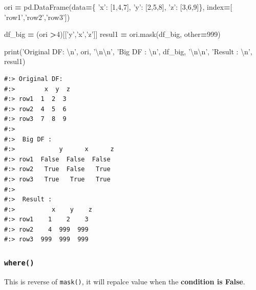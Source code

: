 \documentclass[
]{book}
\newenvironment{Shaded}{\begin{snugshade}}{\end{snugshade}}
\newcommand{\BuiltInTok}[1]{#1}
\newcommand{\CharTok}[1]{\textcolor[rgb]{0.5,0.5,0.5}{#1}}
\newcommand{\DecValTok}[1]{\textcolor[rgb]{0.06,0.06,0.06}{#1}}
\newcommand{\NormalTok}[1]{#1}
\newcommand{\OperatorTok}[1]{\textcolor[rgb]{0.43,0.43,0.43}{\textbf{#1}}}
\newcommand{\StringTok}[1]{\textcolor[rgb]{0.5,0.5,0.5}{#1}}
\begin{document}
\begin{Shaded}
\begin{Highlighting}[]
\NormalTok{ori }\OperatorTok{=}\NormalTok{ pd.DataFrame(data}\OperatorTok{=}\NormalTok{\{}
     \StringTok{'x'}\NormalTok{: [}\DecValTok{1}\NormalTok{,}\DecValTok{4}\NormalTok{,}\DecValTok{7}\NormalTok{],}
     \StringTok{'y'}\NormalTok{: [}\DecValTok{2}\NormalTok{,}\DecValTok{5}\NormalTok{,}\DecValTok{8}\NormalTok{],}
     \StringTok{'z'}\NormalTok{: [}\DecValTok{3}\NormalTok{,}\DecValTok{6}\NormalTok{,}\DecValTok{9}\NormalTok{]\}, index}\OperatorTok{=}\NormalTok{[}
     \StringTok{'row1'}\NormalTok{,}\StringTok{'row2'}\NormalTok{,}\StringTok{'row3'}\NormalTok{])}

\NormalTok{df_big }\OperatorTok{=}\NormalTok{ (ori }\OperatorTok{>}\DecValTok{4}\NormalTok{)[[}\StringTok{'y'}\NormalTok{,}\StringTok{'x'}\NormalTok{,}\StringTok{'z'}\NormalTok{]]}
\NormalTok{resul1 }\OperatorTok{=}\NormalTok{ ori.mask(df_big, other}\OperatorTok{=}\DecValTok{999}\NormalTok{)}

\BuiltInTok{print}\NormalTok{(}\StringTok{'Original DF: }\CharTok{\textbackslash{}n}\StringTok{'}\NormalTok{, ori, }\StringTok{'}\CharTok{\textbackslash{}n\textbackslash{}n}\StringTok{'}\NormalTok{,}
      \StringTok{'Big DF : }\CharTok{\textbackslash{}n}\StringTok{'}\NormalTok{, df_big, }\StringTok{'}\CharTok{\textbackslash{}n\textbackslash{}n}\StringTok{'}\NormalTok{,}
      \StringTok{'Result : }\CharTok{\textbackslash{}n}\StringTok{'}\NormalTok{, resul1)}
\end{Highlighting}
\end{Shaded}

\begin{verbatim}
#:> Original DF: 
#:>        x  y  z
#:> row1  1  2  3
#:> row2  4  5  6
#:> row3  7  8  9 
#:> 
#:>  Big DF : 
#:>            y      x      z
#:> row1  False  False  False
#:> row2   True  False   True
#:> row3   True   True   True 
#:> 
#:>  Result : 
#:>          x    y    z
#:> row1    1    2    3
#:> row2    4  999  999
#:> row3  999  999  999
\end{verbatim}

\hypertarget{where-1}{%
\subsubsection{\texorpdfstring{\texttt{where()}}{where()}}\label{where-1}}

This is reverse of \texttt{mask()}, it will repalce value when the \textbf{condition is False}.
\end{document}
